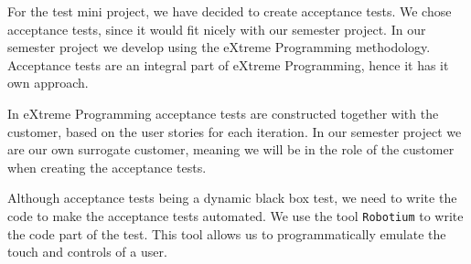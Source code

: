 For the test mini project, we have decided to create acceptance tests.
We chose acceptance tests, since it would fit nicely with our semester project.
In our semester project we develop using the eXtreme Programming methodology.
Acceptance tests are an integral part of eXtreme Programming, hence it has it own approach.

In eXtreme Programming acceptance tests are constructed together with the customer, based on the user stories for each iteration.
In our semester project we are our own surrogate customer, meaning we will be in the role of the customer when creating the acceptance tests.

Although acceptance tests being a dynamic black box test, we need to write the code to make the acceptance tests automated.
We use the tool \texttt{Robotium} to write the code part of the test. 
This tool allows us to programmatically emulate the touch and controls of a user.